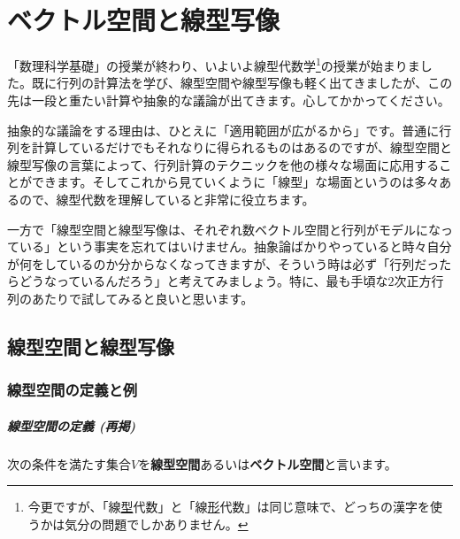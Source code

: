 \chapter{ベクトル空間と線型写像}


「数理科学基礎」の授業が終わり、いよいよ線型代数学\footnote{今更ですが、「線\uline{型}代数」と「線\uline{形}代数」は同じ意味で、どっちの漢字を使うかは気分の問題でしかありません。}の授業が始まりました。既に行列の計算法を学び、線型空間や線型写像も軽く出てきましたが、この先は一段と重たい計算や抽象的な議論が出てきます。心してかかってください。

抽象的な議論をする理由は、ひとえに「適用範囲が広がるから」です。普通に行列を計算しているだけでもそれなりに得られるものはあるのですが、線型空間と線型写像の言葉によって、行列計算のテクニックを他の様々な場面に応用することができます。そしてこれから見ていくように「線型」な場面というのは多々あるので、線型代数を理解していると非常に役立ちます。

一方で「線型空間と線型写像は、それぞれ数ベクトル空間と行列がモデルになっている」という事実を忘れてはいけません。抽象論ばかりやっていると時々自分が何をしているのか分からなくなってきますが、そういう時は必ず「行列だったらどうなっているんだろう」と考えてみましょう。特に、最も手頃な$2$次正方行列のあたりで試してみると良いと思います。

\section{線型空間と線型写像}

\subsection{線型空間の定義と例}

\paragraph{線型空間の定義 (再掲)} \label{def:vector_space}

次の条件を満たす集合$V$を\textbf{線型空間}あるいは\textbf{ベクトル空間}と言います。

